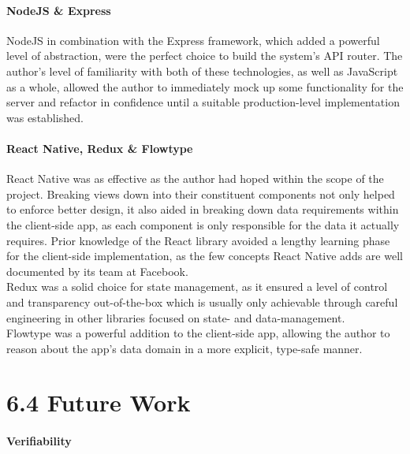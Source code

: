 \paragraph{NodeJS \& Express}\label{nodejs-express}

NodeJS in combination with the Express framework, which added a powerful
level of abstraction, were the perfect choice to build the system's API
router. The author's level of familiarity with both of these
technologies, as well as JavaScript as a whole, allowed the author to
immediately mock up some functionality for the server and refactor in
confidence until a suitable production-level implementation was
established.

\paragraph{React Native, Redux \&
Flowtype}\label{react-native-redux-flowtype}

React Native was as effective as the author had hoped within the scope
of the project. Breaking views down into their constituent components
not only helped to enforce better design, it also aided in breaking down
data requirements within the client-side app, as each component is only
responsible for the data it actually requires. Prior knowledge of the
React library avoided a lengthy learning phase for the client-side
implementation, as the few concepts React Native adds are well
documented by its team at Facebook.\\
Redux was a solid choice for state management, as it ensured a level of
control and transparency out-of-the-box which is usually only achievable
through careful engineering in other libraries focused on state- and
data-management.\\
Flowtype was a powerful addition to the client-side app, allowing the
author to reason about the app's data domain in a more explicit,
type-safe manner.

\section{6.4 Future Work}\label{future-work}

\paragraph{Verifiability}\label{verifiability}

